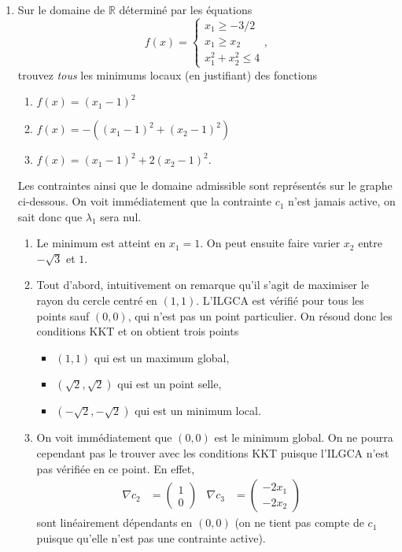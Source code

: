 \begin{enumerate}
\begin{solution}
  \end{solution}
    
  \item Sur le domaine de $\mathbb{R}$ déterminé par les équations
  \[f(x) = \left\{ \begin{array}{rcl}
           x_1 \geq -3/2 \\ 
           x_1 \geq x_2 \\
           x_1^2 + x_2^2 \leq 4 
            \end{array}\right.,
  \]
  trouvez \emph{tous} les minimums locaux (en justifiant) des fonctions
  \begin{enumerate}
    \item $f(x) = (x_1 - 1)^2$
    \item $f(x) = -((x_1 - 1)^2 + (x_2 - 1)^2)$
    \item $f(x) = (x_1 - 1)^2 + 2(x_2 - 1)^2.$
  \end{enumerate}
  
  \begin{solution}
    Les contraintes ainsi que le domaine admissible sont représentés
    sur le graphe ci-dessous.
    On voit immédiatement que la contrainte $c_1$ n'est jamais active,
    on sait donc que $\lambda_1$ sera nul.
    \begin{enumerate}
      \item Le minimum est atteint en $x_1 = 1$.
      On peut ensuite faire varier $x_2$ entre $-\sqrt{3}$ et $1$.
      
      \item Tout d'abord, intuitivement on remarque qu'il s'agit de
      maximiser le rayon du cercle centré en $(1,1)$.
      L'ILGCA est vérifié pour tous les points sauf $(0,0)$,
      qui n'est pas un point particulier.
      On résoud donc les conditions KKT et on obtient trois points
      \begin{itemize}
        \item $(1,1)$ qui est un maximum global,
        \item $(\sqrt{2},\sqrt{2})$ qui est un point selle,
        \item $(-\sqrt{2},-\sqrt{2})$ qui est un minimum local.
      \end{itemize}
      
      \item On voit immédiatement que $(0,0)$ est le minimum global.
      On ne pourra cependant pas le trouver avec les conditions KKT
      puisque l'ILGCA n'est pas vérifiée en ce point.
      En effet,
      \begin{align*}
        \nabla c_2 &= \begin{pmatrix} 1 \\ 0 \end{pmatrix} &
        \nabla c_3 &= \begin{pmatrix} -2x_1 \\ -2x_2 \end{pmatrix} &
      \end{align*}
      sont linéairement dépendants en $(0,0)$ (on ne tient pas compte de $c_1$ 
      puisque qu'elle n'est pas une contrainte active).
    \end{enumerate}    
    

\end{solution}
\end{enumerate}
